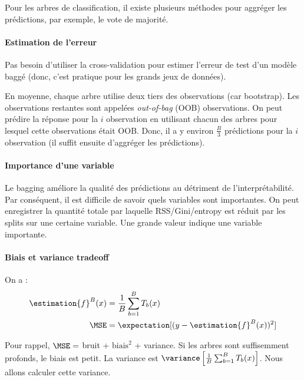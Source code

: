                 Pour les arbres de classification, il existe plusieurs méthodes pour aggréger les prédictions, par exemple, le vote de majorité.

            \paragraph{Estimation de l'erreur}
                Pas besoin d'utiliser la cross-validation pour estimer l'erreur de test d'un modèle baggé (donc, c'est pratique pour les grands jeux de données).

                En moyenne, chaque arbre utilise deux tiers des observations (car bootstrap). Les observations restantes sont appelées \textit{out-of-bag} (OOB) observations. On peut prédire la réponse pour la \(i\)\ieme{} observation en utilisant chacun des arbres pour lesquel cette observations était OOB. Donc, il a y environ \(\frac{B}{3}\) prédictions pour la \(i\)\ieme{} observation (il suffit ensuite d'aggréger les prédictions).

            \paragraph{Importance d'une variable}
                Le bagging améliore la qualité des prédictions au détriment de l'interprétabilité. Par conséquent, il est difficile de savoir quels variables sont importantes. On peut enregistrer la quantité totale par laquelle RSS/Gini/entropy est réduit par les splits sur une certaine variable. Une grande valeur indique une variable importante.

            \paragraph{Biais et variance tradeoff}
                On a :
                \begin{align*}
                    \estimation{f}^B (x) &= \frac{1}{B} \sum_{b = 1}^B T_b(x)\\
                    \MSE &= \expectation[(y - \estimation{f}^B(x))^2]\\
                \end{align*}

                Pour rappel, \(\MSE = \) bruit + \(\text{biais}^2\) + variance. Si les arbres sont suffisemment profonds, le biais est petit. La variance est \(\variance\left[\frac{1}{B} \sum_{b = 1}^B T_b(x)\right]\). Nous allons calculer cette variance.

